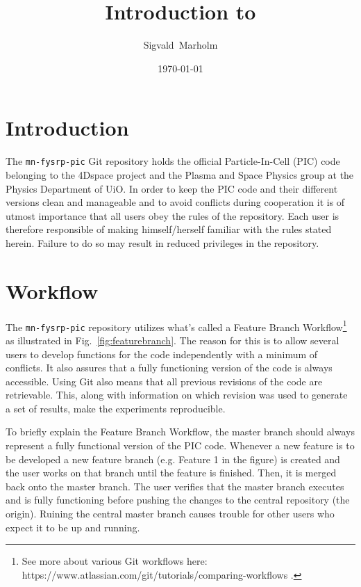 \documentclass[10pt,a4paper]{article}
\author{Sigvald~Marholm}
\title{Introduction to \mnfysrppic}
\date{\today}
\newcommand{\mnfysrppic}{\texttt{mn-fysrp-pic}}
\newcommand{\reffig}[1]{Fig.~\ref{fig:#1}}
\begin{document}
\maketitle
\newpage

\section{Introduction}
The \mnfysrppic{} Git repository holds the official Particle-In-Cell (PIC) code belonging to the 4Dspace project and the Plasma and Space Physics group at the Physics Department of UiO. In order to keep the PIC code and their different versions clean and manageable and to avoid conflicts during cooperation it is of utmost importance that all users obey the rules of the repository. Each user is therefore responsible of making himself/herself familiar with the rules stated herein. Failure to do so may result in reduced privileges in the repository.

\section{Workflow}
The \mnfysrppic{} repository utilizes what's called a Feature Branch Workflow\footnote{See more about various Git workflows here: https://www.atlassian.com/git/tutorials/comparing-workflows .} as illustrated in \reffig{featurebranch}. The reason for this is to allow several users to develop functions for the code independently with a minimum of conflicts. It also assures that a fully functioning version of the code is always accessible. Using Git also means that all previous revisions of the code are retrievable. This, along with information on which revision was used to generate a set of results, make the experiments reproducible. 

To briefly explain the Feature Branch Workflow, the master branch should always represent a fully functional version of the PIC code. Whenever a new feature is to be developed a new feature branch (e.g. Feature 1 in the figure) is created and the user works on that branch until the feature is finished. Then, it is merged back onto the master branch. The user verifies that the master branch executes and is fully functioning before pushing the changes to the central repository (the origin). Ruining the central master branch causes trouble for other users who expect it to be up and running. 
\end{document}
